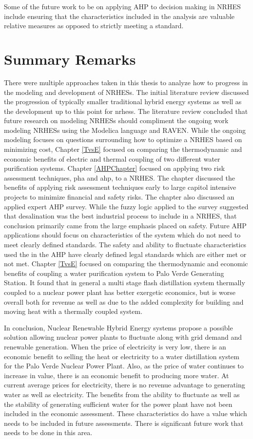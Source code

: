 \documentclass[12pt]{UIdahoMastersThesis}
\begin{document}
Some of the future work to be on applying AHP to decision making in NRHES include ensuring that the characteristics included in the analysis are valuable relative measures as opposed to strictly meeting a standard. 

\section{Summary Remarks}
 There were multiple approaches taken in this thesis to analyze how to progress in the modeling and development of NRHESs. The initial literature review discussed the progression of typically smaller traditional hybrid energy systems as well as the development up to this point for \ac{nrhes}s.  The literature review concluded that future research on modeling NRHESs should compliment the ongoing work modeling NRHESs using the Modelica language and RAVEN.  While the ongoing modeling focuses on questions surrounding how to optimize a NRHES based on minimizing cost, Chapter \ref{TvsE} focused on comparing the thermodynamic and economic benefits of electric and thermal coupling of two different water purification systems. Chapter \ref{AHPChapter} focused on applying two risk assessment techniques, \ac{pha} and \ac{ahp}, to a NRHES.  The chapter discussed the benefits of applying risk assessment techniques early to large capitol intensive projects to minimize financial and safety risks.  The chapter also discussed an applied expert AHP survey.  While the fuzzy logic applied to the survey suggested that desalination was the best industrial process to include in a NRHES, that conclusion primarily came from the large emphasis placed on safety.  Future AHP applications should focus on characteristics of the system which do not need to meet clearly defined standards.  The safety and ability to fluctuate characteristics used the in the AHP have clearly defined legal standards which are either met or not met.  Chapter \ref{TvsE} focused on comparing the thermodynamic and economic benefits of coupling a water purification system to Palo Verde Generating Station. It found that in general a multi stage flash distillation system thermally coupled to a nuclear power plant has better exergetic economics, but is worse overall both for revenue as well as due to the added complexity for building and moving heat with a thermally coupled system. 
 
 In conclusion, Nuclear Renewable Hybrid Energy systems propose a possible solution allowing nuclear power plants to fluctuate along with grid demand and renewable generation.  When the price of electricity is very low, there is an economic benefit to selling the heat or electricity to a water distillation system for the Palo Verde Nuclear Power Plant. Also, as the price of water continues to increase in value, there is an economic benefit to producing more water. At current average prices for electricity, there is no revenue advantage to generating water as well as electricity.  The benefits from the ability to fluctuate as well as the stability of generating sufficient water for the power plant have not been included in the economic assessment. These characteristics do have a value which needs to be included in future assessments. There is significant future work that needs to be done in this area.  
\end{document}
